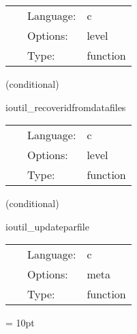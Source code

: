 \documentclass{article}
\begin{document}
\hspace{5mm}

 \begin{tabular*}{160mm}{cll} 
~ & Language:  & c \\ 
~ & Options:  & level \\ 
~ & Type:  & function \\ 
\end{tabular*} 


\vspace{5mm}

   (conditional) 

\hspace{5mm} ioutil\_recoveridfromdatafiles 

\hspace{5mm}{\it initial data recovery routine } 


\hspace{5mm}

 \begin{tabular*}{160mm}{cll} 
~ & Language:  & c \\ 
~ & Options:  & level \\ 
~ & Type:  & function \\ 
\end{tabular*} 


\vspace{5mm}

   (conditional) 

\hspace{5mm} ioutil\_updateparfile 

\hspace{5mm}{\it append steered parameters to parameter file } 


\hspace{5mm}

 \begin{tabular*}{160mm}{cll} 
~ & Language:  & c \\ 
~ & Options:  & meta \\ 
~ & Type:  & function \\ 
\end{tabular*} 



\vspace{5mm}\parskip = 10pt 
\end{document}

